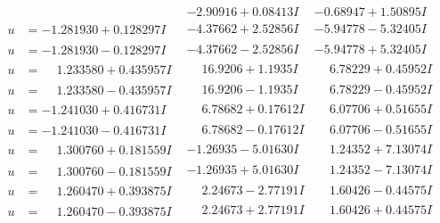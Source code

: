 \documentclass[1p]{elsarticle_modified}
\theoremstyle{definition}
\begin{document}
$$\begin{array}{c|c|c}
 & -2.90916 + 0.08413 I & -0.68947 + 1.50895 I \\ \hline\begin{aligned}
u &= -1.281930 + 0.128297 I\end{aligned}
 & -4.37662 + 2.52856 I & -5.94778 - 5.32405 I \\ \hline\begin{aligned}
u &= -1.281930 - 0.128297 I\end{aligned}
 & -4.37662 - 2.52856 I & -5.94778 + 5.32405 I \\ \hline\begin{aligned}
u &= \phantom{-}1.233580 + 0.435957 I\end{aligned}
 & \phantom{-}16.9206 + 1.1935 I & \phantom{-}6.78229 + 0.45952 I \\ \hline\begin{aligned}
u &= \phantom{-}1.233580 - 0.435957 I\end{aligned}
 & \phantom{-}16.9206 - 1.1935 I & \phantom{-}6.78229 - 0.45952 I \\ \hline\begin{aligned}
u &= -1.241030 + 0.416731 I\end{aligned}
 & \phantom{-}6.78682 + 0.17612 I & \phantom{-}6.07706 + 0.51655 I \\ \hline\begin{aligned}
u &= -1.241030 - 0.416731 I\end{aligned}
 & \phantom{-}6.78682 - 0.17612 I & \phantom{-}6.07706 - 0.51655 I \\ \hline\begin{aligned}
u &= \phantom{-}1.300760 + 0.181559 I\end{aligned}
 & -1.26935 - 5.01630 I & \phantom{-}1.24352 + 7.13074 I \\ \hline\begin{aligned}
u &= \phantom{-}1.300760 - 0.181559 I\end{aligned}
 & -1.26935 + 5.01630 I & \phantom{-}1.24352 - 7.13074 I \\ \hline\begin{aligned}
u &= \phantom{-}1.260470 + 0.393875 I\end{aligned}
 & \phantom{-}2.24673 - 2.77191 I & \phantom{-}1.60426 - 0.44575 I \\ \hline\begin{aligned}
u &= \phantom{-}1.260470 - 0.393875 I\end{aligned}
 & \phantom{-}2.24673 + 2.77191 I & \phantom{-}1.60426 + 0.44575 I \\ \hline\begin{aligned}

\end{aligned}
\end{array}$$
\end{document}
